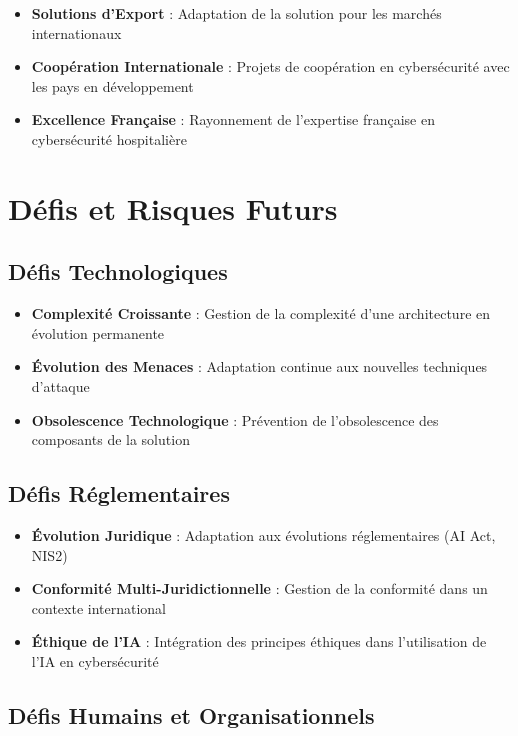 \begin{itemize}
    \item \textbf{Solutions d'Export} : Adaptation de la solution pour les marchés internationaux
    \item \textbf{Coopération Internationale} : Projets de coopération en cybersécurité avec les pays en développement
    \item \textbf{Excellence Française} : Rayonnement de l'expertise française en cybersécurité hospitalière
\end{itemize}

\section{Défis et Risques Futurs}

\subsection{Défis Technologiques}

\begin{itemize}
    \item \textbf{Complexité Croissante} : Gestion de la complexité d'une architecture en évolution permanente
    \item \textbf{Évolution des Menaces} : Adaptation continue aux nouvelles techniques d'attaque
    \item \textbf{Obsolescence Technologique} : Prévention de l'obsolescence des composants de la solution
\end{itemize}

\subsection{Défis Réglementaires}

\begin{itemize}
    \item \textbf{Évolution Juridique} : Adaptation aux évolutions réglementaires (AI Act, NIS2)
    \item \textbf{Conformité Multi-Juridictionnelle} : Gestion de la conformité dans un contexte international
    \item \textbf{Éthique de l'IA} : Intégration des principes éthiques dans l'utilisation de l'IA en cybersécurité
\end{itemize}

\subsection{Défis Humains et Organisationnels}

